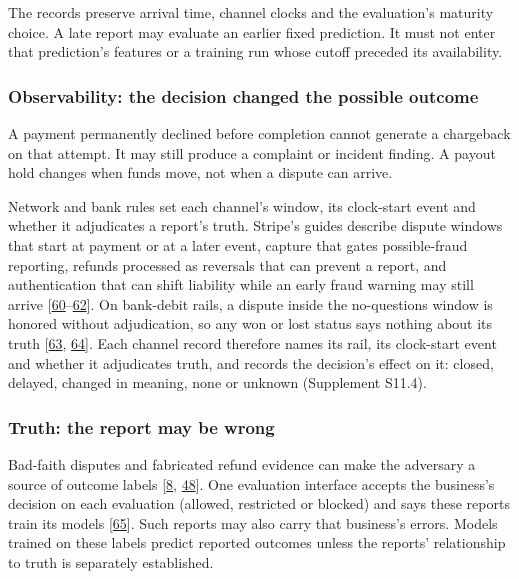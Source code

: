 \documentclass[acmlarge,nonacm]{acmart}
\begin{document}
The records preserve arrival time, channel clocks and the evaluation's
maturity choice. A late report may evaluate an earlier fixed prediction.
It must not enter that prediction's features or a training run whose
cutoff preceded its availability.

\hypertarget{observability-the-decision-changed-the-possible-outcome}{%
\subsubsection*{Observability: the decision changed the possible
outcome}\label{observability-the-decision-changed-the-possible-outcome}}

A payment permanently declined before completion cannot generate a
chargeback on that attempt. It may still produce a complaint or incident
finding. A payout hold changes when funds move, not when a dispute can
arrive.

Network and bank rules set each channel's window, its clock-start event
and whether it adjudicates a report's truth. Stripe's guides describe
dispute windows that start at payment or at a later event, capture that
gates possible-fraud reporting, refunds processed as reversals that can
prevent a report, and authentication that can shift liability while an
early fraud warning may still arrive
{[}\protect\hyperlink{ref-Stripe2026Disputes}{60}--\protect\hyperlink{ref-Stripe2026ThreeDS}{62}{]}.
On bank-debit rails, a dispute inside the no-questions window is honored
without adjudication, so any won or lost status says nothing about its
truth {[}\protect\hyperlink{ref-Stripe2026SEPADebit}{63},
\protect\hyperlink{ref-Stripe2026ACHTerms}{64}{]}. Each channel record
therefore names its rail, its clock-start event and whether it
adjudicates truth, and records the decision's effect on it: closed,
delayed, changed in meaning, none or unknown (Supplement S11.4).

\hypertarget{truth-the-report-may-be-wrong}{%
\subsubsection*{Truth: the report may be
wrong}\label{truth-the-report-may-be-wrong}}

Bad-faith disputes and fabricated refund evidence can make the adversary
a source of outcome labels
{[}\protect\hyperlink{ref-Dhama2026Causal}{8},
\protect\hyperlink{ref-Zhang2026Refund}{48}{]}. One evaluation interface
accepts the business's decision on each evaluation (allowed, restricted
or blocked) and says these reports train its models
{[}\protect\hyperlink{ref-Stripe2026CAE}{65}{]}. Such reports may also
carry that business's errors. Models trained on these labels predict
reported outcomes unless the reports' relationship to truth is
separately established.
\end{document}

